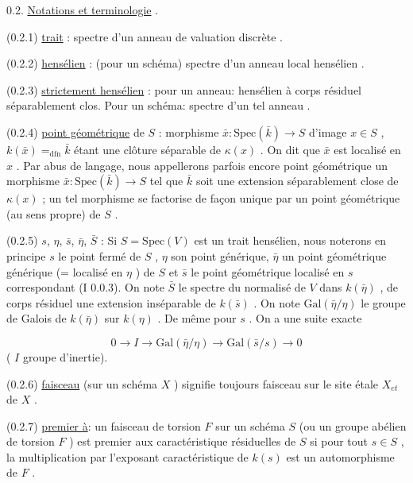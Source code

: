

0.2. \underline{Notations et terminologie} .

(0.2.1) \underline{trait} : spectre d'un anneau de valuation discrète .

(0.2.2) \underline{hensélien} : (pour un schéma) spectre d'un anneau local hensélien .

(0.2.3) \underline{strictement hensélien} : pour un anneau: hensélien à corps résiduel séparablement clos. Pour un schéma: spectre d'un tel anneau .

(0.2.4) \underline{point géométrique} de $S$ : morphisme $\bar{x} : \mathrm{Spec}(\bar{k}) \to S$ d'image $x \in S$ , $k(\bar{x}) =_{\mathrm{dfn}} \bar{k}$ étant une clôture séparable de $\kappa(x)$ . On dit que $\bar{x}$ est localisé en $x$ . Par abus de langage, nous appellerons parfois encore point géométrique un morphisme $\bar{x} : \mathrm{Spec}(\bar{k}) \to S$ tel que $\bar{k}$ soit une extension séparablement close de $\kappa(x)$ ; un tel morphisme se factorise de façon unique par un point géométrique (au sens propre) de $S$ .

(0.2.5) $s$, $\eta$, $\bar{s}$, $\bar{\eta}$, $\bar{S}$ : Si $S = \mathrm{Spec}(V)$ est un trait hensélien, nous noterons en principe $s$ le point fermé de $S$ , $\eta$ son point générique, $\bar{\eta}$ un point géométrique générique (= localisé en $\eta$ ) de $S$ et $\bar{s}$ le point géométrique localisé en $s$ correspondant (I 0.0.3). On note $\bar{S}$ le spectre du normalisé de $V$ dans $k(\bar{\eta})$ , de corps résiduel une extension inséparable de $k(\bar{s})$ . On note $\mathrm{Gal}(\bar{\eta}/\eta )$ le groupe de Galois de $k(\bar{\eta})$ sur $k(\eta)$ . De même pour $s$ . On a une suite exacte

\begin{equation*}
0 \longrightarrow I \longrightarrow \mathrm{Gal}(\bar{\eta}/\eta) \longrightarrow \mathrm{Gal}(\bar{s}/s) \longrightarrow 0
\end{equation*}
( $I$ groupe d'inertie).

(0.2.6) \underline{faisceau} (sur un schéma $X$ ) signifie toujours faisceau sur le site étale $X_{et}$ de $X$ .

(0.2.7) \underline{premier à}: un faisceau de torsion $F$ sur un schéma $S$ (ou un groupe abélien de torsion $F$ ) est premier aux caractéristique résiduelles de $S$ si pour tout $s \in S$ , la multiplication par l'exposant caractéristique de $k(s)$ est un automorphisme de $F$ .


